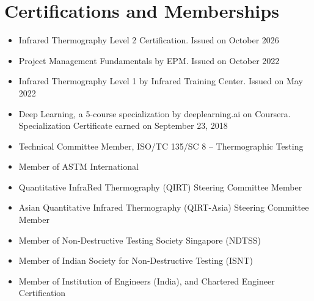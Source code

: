 \documentclass{my_cv}%
\begin{document}
\section{Certifications and Memberships}
\vspace{0.3em}
\begin{itemize}[leftmargin=0.15in]
\setlength\itemsep{-0.15em}
\color{mygray}
\item[\faCertificate] Infrared Thermography Level 2 Certification. Issued on October 2026
\item[\faCertificate] Project Management Fundamentals by EPM. Issued on October 2022
\item[\faCertificate] Infrared Thermography Level 1 by Infrared Training Center. Issued on May 2022
\item[\faCertificate] Deep Learning, a 5-course specialization by deeplearning.ai on Coursera. Specialization Certificate earned on September 23, 2018
\item [\faUsers] Technical Committee Member, ISO/TC 135/SC 8 -- Thermographic Testing
\item [\faUsers] Member of ASTM International
\item [\faUsers] Quantitative InfraRed Thermography (QIRT) Steering Committee Member
\item [\faUsers] Asian Quantitative Infrared Thermography (QIRT-Asia) Steering Committee Member
\item [\faUsers] Member of Non-Destructive Testing Society Singapore (NDTSS)
\item [\faUsers] Member of Indian Society for Non-Destructive Testing (ISNT)
\item [\faUsers] Member of Institution of Engineers (India), and Chartered Engineer Certification
\end{itemize}
\end{document}
